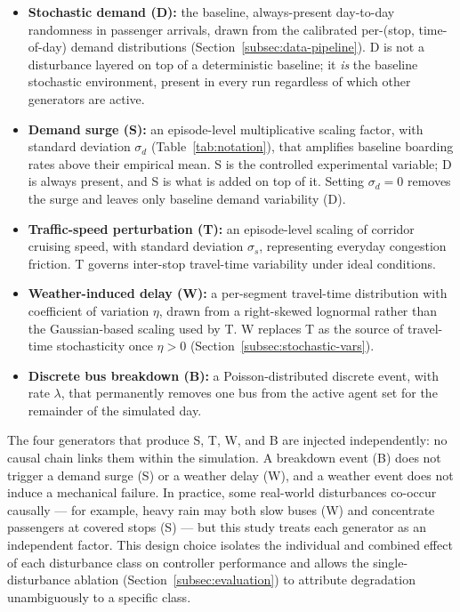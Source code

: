 \begin{itemize}
\item \textbf{Stochastic demand (D):} the baseline, always-present day-to-day randomness in passenger arrivals, drawn from the calibrated per-(stop, time-of-day) demand distributions (Section~\ref{subsec:data-pipeline}). D is not a disturbance layered on top of a deterministic baseline; it \textit{is} the baseline stochastic environment, present in every run regardless of which other generators are active.
\item \textbf{Demand surge (S):} an episode-level multiplicative scaling factor, with standard deviation $\sigma_d$ (Table~\ref{tab:notation}), that amplifies baseline boarding rates above their empirical mean. S is the controlled experimental variable; D is always present, and S is what is added on top of it. Setting $\sigma_d = 0$ removes the surge and leaves only baseline demand variability (D).
\item \textbf{Traffic-speed perturbation (T):} an episode-level scaling of corridor cruising speed, with standard deviation $\sigma_s$, representing everyday congestion friction. T governs inter-stop travel-time variability under ideal conditions.
\item \textbf{Weather-induced delay (W):} a per-segment travel-time distribution with coefficient of variation $\eta$, drawn from a right-skewed lognormal rather than the Gaussian-based scaling used by T. W replaces T as the source of travel-time stochasticity once $\eta > 0$ (Section~\ref{subsec:stochastic-vars}).
\item \textbf{Discrete bus breakdown (B):} a Poisson-distributed discrete event, with rate $\lambda$, that permanently removes one bus from the active agent set for the remainder of the simulated day.
\end{itemize}

The four generators that produce S, T, W, and B are injected independently: no causal chain links them within the simulation. A breakdown event (B) does not trigger a demand surge (S) or a weather delay (W), and a weather event does not induce a mechanical failure. In practice, some real-world disturbances co-occur causally --- for example, heavy rain may both slow buses (W) and concentrate passengers at covered stops (S) --- but this study treats each generator as an independent factor. This design choice isolates the individual and combined effect of each disturbance class on controller performance and allows the single-disturbance ablation (Section~\ref{subsec:evaluation}) to attribute degradation unambiguously to a specific class.

